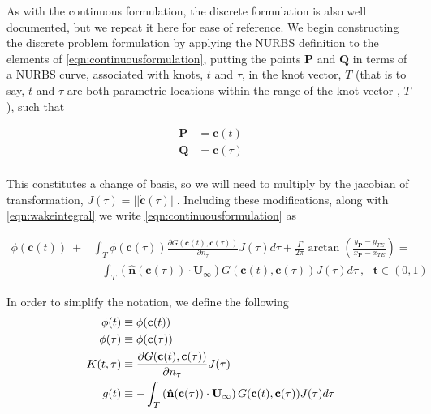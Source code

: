 	As with the continuous formulation, the discrete formulation is also well documented,\cite{Politis2014, Kostas2017Shape-optimizat} but we repeat it here for ease of reference. We begin constructing the discrete problem formulation by applying the NURBS definition to the elements of \cref{eqn:continuousformulation}, putting the points $\mathbf{P}$ and $\mathbf{Q}$ in terms of a NURBS curve, associated with knots, $t$ and $\tau$, in the knot vector, $T$ (that is to say, $t$ and $\tau$ are both parametric locations within the range of the knot vector , $T$), such that
	
	\begin{equation}
	\begin{aligned}
	\mathbf{P} &= \mathbf{c}(t)\\
	\mathbf{Q} &= \mathbf{c}(\tau)\\
	\end{aligned}
	\end{equation}
	
	This constitutes a change of basis, so we will need to multiply by the jacobian of transformation, \(J(\tau) = ||\dot{\mathbf{c}}(\tau)||\). Including these modifications, along with \cref{eqn:wakeintegral} we write \cref{eqn:continuousformulation} as
	
	\begin{equation}
	\begin{aligned}
	\label{eqn:discreteformulationlong}
	\phi(\mathbf{c}(t))~+ &\int_{T} \phi(\mathbf{c}(\tau))\frac{\partial G(\mathbf{c}(t),\mathbf{c}(\tau))}{\partial n_\tau} J(\tau) d\tau +  \frac{\Gamma}{2\pi} \arctan\left( \frac{y_{\mathbf{P}} - y_{TE}}{x_{\mathbf{P}}-x_{TE}} \right) =\\
	&- \int_{T} \left(\mathbf{\hat{n}}(\mathbf{c}(\tau)) \cdot  \mathbf{U}_{\infty} \right) G(\mathbf{c}(t),\mathbf{c}(\tau))J(\tau) d\tau~, ~~~\mathbf{t} \in (0,1)
	\end{aligned}
	\end{equation}
	
	\noindent In order to simplify the notation, we define the following
	\begin{equation}
	\centering
	\begin{aligned}
	\label{eqn:simplenotation}
	\phi(t) &\equiv \phi(\mathbf{c}(t))\\
	\phi(\tau) &\equiv \phi(\mathbf{c}(\tau))\\
	K(t,\tau) &\equiv \frac{\partial G(\mathbf{c}(t),\mathbf{c}(\tau))}{\partial n_\tau}J(\tau)\\
	g(t) &\equiv -\int_{T} \left(\mathbf{\hat{n}}(\mathbf{c}(\tau)) \cdot  \mathbf{U}_{\infty} \right) G(\mathbf{c}(t),\mathbf{c}(\tau))J(\tau) d\tau \\
	\end{aligned}
	\end{equation}
	
